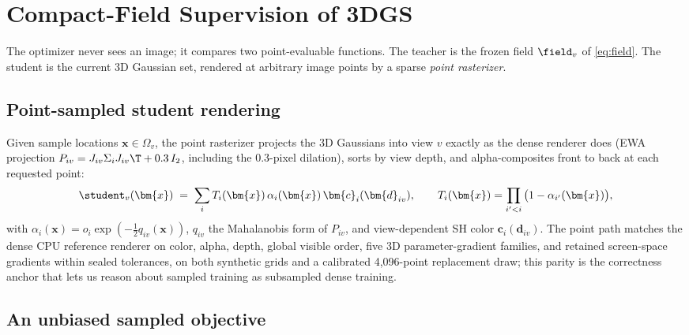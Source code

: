 \section{Compact-Field Supervision of 3DGS}
\label{sec:compact-supervision}

The optimizer never sees an image; it compares two point-evaluable functions.  The teacher is
the frozen field $\field_v$ of \cref{eq:field}.  The student is the current 3D Gaussian set,
rendered at arbitrary image points by a sparse \emph{point rasterizer}.

\subsection{Point-sampled student rendering}
\label{sec:point-rasterizer}

Given sample locations $\bm{x} \in \Omega_v$, the point rasterizer projects the 3D Gaussians
into view $v$ exactly as the dense renderer does (EWA projection
$P_{iv} = J_{iv} \Sigma_i J_{iv}\T + 0.3\,I_2$, including the $0.3$-pixel dilation), sorts by
view depth, and alpha-composites front to back at each requested point:
\begin{equation}
  \student_v(\bm{x}) \;=\; \sum_{i} T_i(\bm{x})\, \alpha_i(\bm{x})\, \bm{c}_i(\bm{d}_{iv}),
  \qquad
  T_i(\bm{x}) = \prod_{i' < i} \big(1 - \alpha_{i'}(\bm{x})\big),
  \label{eq:student}
\end{equation}
with $\alpha_i(\bm{x}) = o_i \exp(-\tfrac12 q_{iv}(\bm{x}))$, $q_{iv}$ the Mahalanobis form of
$P_{iv}$, and view-dependent SH color $\bm{c}_i(\bm{d}_{iv})$.  The point path matches the
dense CPU reference renderer on color, alpha, depth, global visible order, five 3D
parameter-gradient families, and retained screen-space gradients within sealed tolerances, on
both synthetic grids and a calibrated 4{,}096-point replacement draw; this parity is the
correctness anchor that lets us reason about sampled training as subsampled dense
training.

\subsection{An unbiased sampled objective}
\label{sec:objective}

